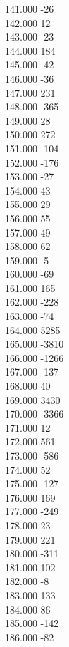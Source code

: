 { 141.000	-26 \\
 142.000	12 \\
 143.000	-23 \\
 144.000	184 \\
 145.000	-42 \\
 146.000	-36 \\
 147.000	231 \\
 148.000	-365 \\
 149.000	28 \\
 150.000	272 \\
 151.000	-104 \\
 152.000	-176 \\
 153.000	-27 \\
 154.000	43 \\
 155.000	29 \\
 156.000	55 \\
 157.000	49 \\
 158.000	62 \\
 159.000	-5 \\
 160.000	-69 \\
 161.000	165 \\
 162.000	-228 \\
 163.000	-74 \\
 164.000	5285 \\
 165.000	-3810 \\
 166.000	-1266 \\
 167.000	-137 \\
 168.000	40 \\
 169.000	3430 \\
 170.000	-3366 \\
 171.000	12 \\
 172.000	561 \\
 173.000	-586 \\
 174.000	52 \\
 175.000	-127 \\
 176.000	169 \\
 177.000	-249 \\
 178.000	23 \\
 179.000	221 \\
 180.000	-311 \\
 181.000	102 \\
 182.000	-8 \\
 183.000	133 \\
 184.000	86 \\
 185.000	-142 \\
 186.000	-82 \\
}
